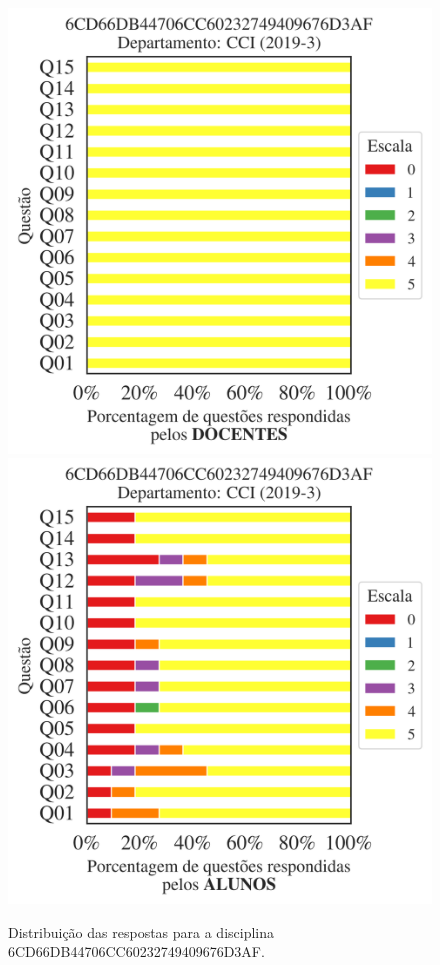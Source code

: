 \documentclass[a4paper,10pt]{article}
\begin{document}
\begin{figure}[h]
\centering
\includegraphics[width=0.485\linewidth]{analise_disciplina_departamento_CCI_6CD66DB44706CC60232749409676D3AF_docentes.png}
\includegraphics[width=0.485\linewidth]{analise_disciplina_departamento_CCI_6CD66DB44706CC60232749409676D3AF_alunos.png}
\caption{\label{fig:analise_geral_departamento}                Distribuição das respostas para a disciplina 6CD66DB44706CC60232749409676D3AF. }
\end{figure}
\end{document}
